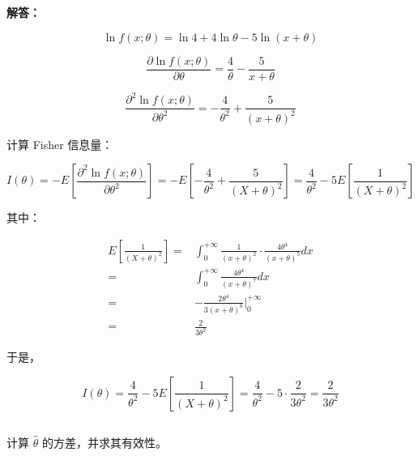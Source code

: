 \documentclass[12pt,a4paper]{article}
\begin{document}
\begin{answerbox}
\textbf{解答：}

$$
\ln f(x; \theta) = \ln 4 + 4 \ln \theta - 5 \ln (x + \theta)
$$

$$
\frac{\partial \ln f(x; \theta)}{\partial \theta} = \frac{4}{\theta} - \frac{5}{x + \theta}
$$

$$
\frac{\partial^2 \ln f(x; \theta)}{\partial \theta^2} = -\frac{4}{\theta^2} + \frac{5}{(x + \theta)^2}
$$

计算 Fisher 信息量：

$$
I(\theta) = -E\left[\frac{\partial^2 \ln f(x; \theta)}{\partial \theta^2}\right] = -E\left[-\frac{4}{\theta^2} + \frac{5}{(X + \theta)^2}\right] = \frac{4}{\theta^2} - 5 E\left[\frac{1}{(X + \theta)^2}\right]
$$

其中：

$$
\begin{aligned}
E\left[\frac{1}{(X + \theta)^2}\right] =& \int_{0}^{+\infty} \frac{1}{(x + \theta)^2} \cdot \frac{4\theta^4}{(x+\theta)^5} dx \\
=& \int_{0}^{+\infty} \frac{4\theta^4}{(x + \theta)^7} dx \\
=& -\frac{2\theta^4}{3(x+\theta)^6} \Big|_0^{+\infty} \\
=& \frac{2}{3\theta^2}
\end{aligned}
$$

于是，

$$
I(\theta) = \frac{4}{\theta^2} - 5 E\left[\frac{1}{(X + \theta)^2}\right] = \frac{4}{\theta^2} - 5 \cdot \frac{2}{3\theta^2} = \frac{2}{3\theta^2}
$$

\end{answerbox}

\subsection{}

计算 $\hat{\theta}$ 的方差，并求其有效性。
\end{document}
